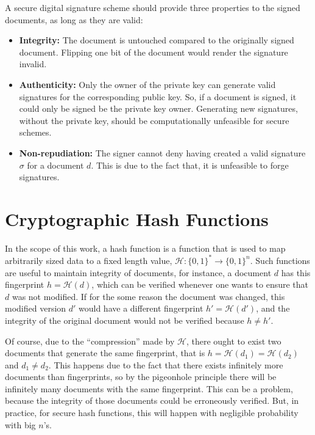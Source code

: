 \documentclass{ufsctex/ufsctex}
\begin{document}
A secure digital signature scheme should provide three properties to the signed
documents, as long as they are valid:

\begin{itemize}

	\item \textbf{Integrity:} The document is untouched compared to the
	originally signed document. Flipping one bit of the document would render
	the signature invalid.

	\item \textbf{Authenticity:} Only the owner of the private key can generate
	valid signatures for the corresponding public key. So, if a document is
	signed, it could only be signed be the private key owner. Generating new
	signatures, without the private key, should be computationally unfeasible
	for secure schemes.

	\item \textbf{Non-repudiation:} The signer cannot deny having created a
	valid signature $\sigma$ for a document $d$. This is due to the fact that,
	it is unfeasible to forge signatures.

\end{itemize}

\section{Cryptographic Hash Functions}

In the scope of this work, a hash function is a function that is used to map
arbitrarily sized data to a fixed length value,  $\mathcal{H}:\{0,
1\}^* \rightarrow \{0, 1\}^n$. Such functions are useful to maintain integrity
of documents, for instance, a document $d$ has this fingerprint $h =
\mathcal{H}(d)$, which can be verified whenever one wants to ensure that $d$
was not modified. If for the some reason the document was changed, this
modified version $d'$ would have a different fingerprint $h' =
\mathcal{H}(d')$, and the integrity of the original document would not be
verified because $h \ne h'$.

Of course, due to the ``compression'' made by $\mathcal{H}$, there ought to
exist two documents that generate the same fingerprint, that is $h =
\mathcal{H}(d_1) = \mathcal{H}(d_2)$ and $d_1 \ne d_2$. This happens due to the
fact that there exists infinitely more documents than fingerprints, so by the
pigeonhole principle there will be infinitely many documents with the same
fingerprint. This can be a problem, because the integrity of those documents
could be erroneously verified. But, in practice, for secure hash functions,
this will happen with negligible probability with big $n$'s.
\end{document}
